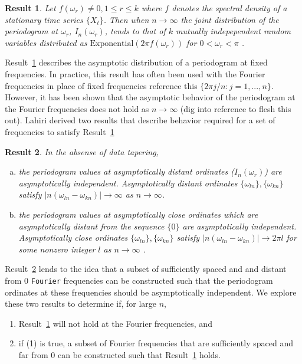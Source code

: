 \documentclass{article}\usepackage{graphicx, color}
\newcommand{\mj}[1]{{\color{blue} #1}}
\theoremstyle{plain}
\newtheorem{res}{Result}
\begin{document}
\begin{res} \label{res:first}
Let $f(\omega_r) \not= 0, 1 \le r \le k$ where $f$ denotes the spectral density of a stationary time series $\{X_t\}$. Then when $n\rightarrow \infty$ the joint distribution of the periodogram at $\omega_r$, $I_n(\omega_r)$, tends to that of $k$ mutually indepependent random variables distributed as $\text{Exponential}(2\pi f(\omega_r))$ for $0<\omega_r<\pi$ \cite{brockwell2002introduction}. 
\end{res}

Result~\ref{res:first} describes the asymptotic distribution of a periodogram at fixed frequencies. In practice, this result has often been used with the Fourier frequencies in place of fixed frequencies \mj{reference this} $\{2\pi j/n : j=1,...,n\}$. However, it has been shown that the asymptotic behavior of the periodogram at the Fourier frequencies does not hold as $n \rightarrow \infty$ \mj{(dig into reference to flesh this out)}. Lahiri \cite{lahiri2003necessary} derived two results that describe behavior required for a set of frequencies to satisfy Result~\ref{res:first}

\begin{res} \label{res:lahiri}
In the absense of data tapering,
\begin{enumerate}[(a)]
\item the periodogram values at asymptotically distant ordinates ($I_n(\omega_r)$) are asymptotically independent.  Asymptotically distant ordinates $\{\omega_{ln}\}, \{\omega_{kn}\}$ satisfy $|n(\omega_{ln} - \omega_{kn})| \rightarrow \infty$ as $n \rightarrow \infty$.

\item the periodogram values at asymptotically close ordinates which are asymptotically distant from the sequence $\{0\}$ are asymptotically independent. Asymptotically close ordinates $\{\omega_{ln}\}, \{\omega_{kn}\}$ satisfy $|n(\omega_{ln} - \omega_{kn})| \rightarrow 2\pi l$ for some nonzero integer $l$ as $n \rightarrow \infty$ \cite{lahiri2003necessary}.
\end{enumerate}
\end{res}


Result~\ref{res:lahiri} lends to the idea that a subset of sufficiently spaced and and distant from 0 \texttt{Fourier} frequencies can be constructed such that the periodogram ordinates at these frequencies should be asymptotically independent. \mj{We explore these two results to determine if}, for large $n$,
\begin{enumerate}
  \item Result~\ref{res:first} will not hold at the Fourier frequencies, and
  \item if (1) is true, a subset of Fourier frequencies that are sufficiently spaced and far from 0 can be constructed such that Result~\ref{res:first} holds.
\end{enumerate}
\end{document}
